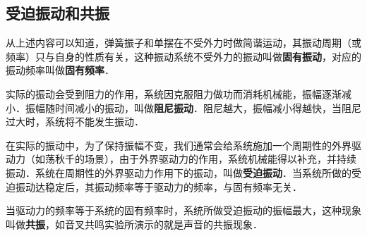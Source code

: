 \subsection{受迫振动和共振}

从上述内容可以知道，弹簧振子和单摆在不受外力时做简谐运动，其振动周期（或频率）只与自身的性质有关，这种振动系统不受外力的振动叫做\textbf{固有振动}，对应的振动频率叫做\textbf{固有频率}．

实际的振动会受到阻力的作用，系统因克服阻力做功而消耗机械能，振幅逐渐减小．振幅随时间减小的振动，叫做\textbf{阻尼振动}．阻尼越大，振幅减小得越快，当阻尼过大时，系统将不能发生振动．

在实际的振动中，为了保持振幅不变，我们通常会给系统施加一个周期性的外界驱动力（如荡秋千的场景），由于外界驱动力的作用，系统机械能得以补充，并持续振动．系统在周期性的外界驱动力作用下的振动，叫做\textbf{受迫振动}．当系统所做的受迫振动达稳定后，其振动频率等于驱动力的频率，与固有频率无关．

当驱动力的频率等于系统的固有频率时，系统所做受迫振动的振幅最大，这种现象叫做\textbf{共振}，如音叉共鸣实验所演示的就是声音的共振现象．